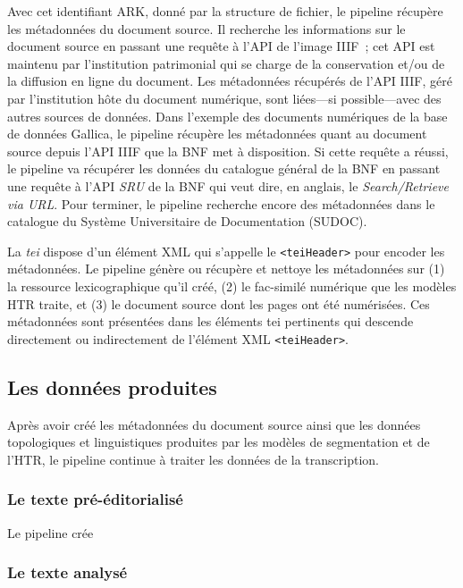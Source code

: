 \documentclass[class=article, crop=false]{standalone}
\begin{document}
Avec cet identifiant ARK, donné par la structure de fichier, le pipeline récupère les métadonnées du document source. Il recherche les informations sur le document source en passant une requête à l'API de l'image \acrshort{IIIF}~; cet API est maintenu par l'institution patrimonial qui se charge de la conservation et/ou de la diffusion en ligne du document. Les métadonnées récupérés de l'API IIIF, géré par l'institution hôte du document numérique, sont liées---si possible---avec des autres sources de données. Dans l'exemple des documents numériques de la base de données Gallica, le pipeline récupère les métadonnées quant au document source depuis l'API \acrshort{IIIF} que la \acrshort{BNF} met à disposition. Si cette requête a réussi, le pipeline va récupérer les données du catalogue général de la \acrshort{BNF} en passant une requête à l'API \textit{SRU} de la \acrshort{BNF} qui veut dire, en anglais, le \textit{Search/Retrieve via URL}. Pour terminer, le pipeline recherche encore des métadonnées dans le catalogue du Système Universitaire de Documentation (SUDOC).

La \textit{\acrlong{tei}} dispose d'un élément XML qui s'appelle le \texttt{<teiHeader>} pour encoder les métadonnées. Le pipeline génère ou récupère et nettoye les métadonnées sur (1) la ressource lexicographique qu'il créé, (2) le fac-similé numérique que les modèles \acrshort{HTR} traite, et (3) le document source dont les pages ont été numérisées. Ces métadonnées sont présentées dans les éléments \acrshort{tei} pertinents qui descende directement ou indirectement de l'élément XML \texttt{<teiHeader>}.

\subsection{Les données produites}
Après avoir créé les métadonnées du document source ainsi que les données topologiques et linguistiques produites par les modèles de segmentation et de l'\acrshort{HTR}, le pipeline continue à traiter les données de la transcription.

\subsubsection{Le texte pré-éditorialisé}
Le pipeline crée 

\subsubsection{Le texte analysé}
\end{document}
